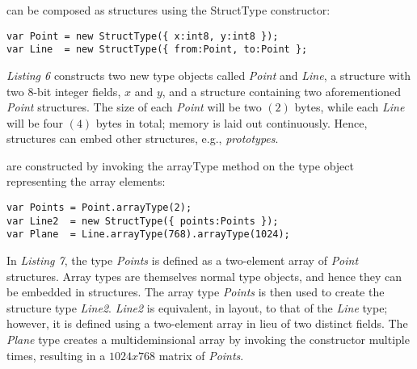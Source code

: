 \begin{center}
\begin{minipage}{0.7\dimexpr\paperwidth}
\hspace{-1em} can be composed as structures using the StructType constructor:

\begin{lstfloat}
\begin{lstlisting}[style=JS,caption=Struct type objects]
var Point = new StructType({ x:int8, y:int8 });
var Line  = new StructType({ from:Point, to:Point };
\end{lstlisting}
\vspace{-2em}
\end{lstfloat}
\textit{Listing 6} constructs two new type objects called \textit{Point} and \textit{Line}, a structure with 
two $8$-bit integer fields, $x$ and $y$, and a structure containing two aforementioned \textit{Point} structures.
The size of each \textit{Point} will be two $(2)$ bytes, while each \textit{Line} will be four $(4)$ bytes in total;
memory is laid out continuously. Hence, structures can embed other structures, e.g., \textit{prototypes}.
\end{minipage}

\begin{minipage}{0.7\dimexpr\paperwidth}
\hspace{-1em} are constructed by invoking the arrayType method 
on the type object representing the array elements:

\begin{lstfloat}
\begin{lstlisting}[style=JS,caption=Array type objects]
var Points = Point.arrayType(2);
var Line2  = new StructType({ points:Points });
var Plane  = Line.arrayType(768).arrayType(1024);
\end{lstlisting}
\vspace{-2em}
\end{lstfloat}
In \textit{Listing 7}, the type \textit{Points} is defined as a two-element array of \textit{Point} structures. Array types are 
themselves normal type objects, and hence they can be embedded in structures. 
The array type \textit{Points} is then used to create the structure type \textit{Line2}. \textit{Line2}
is equivalent, in layout, to that of the \textit{Line} type; however, it is defined using a two-element array
in lieu of two distinct fields. The \textit{Plane} type creates a multideminsional array by invoking
the constructor multiple times, resulting in a $1024x768$ matrix of \textit{Points}. \\
\end{minipage}
\end{center}
